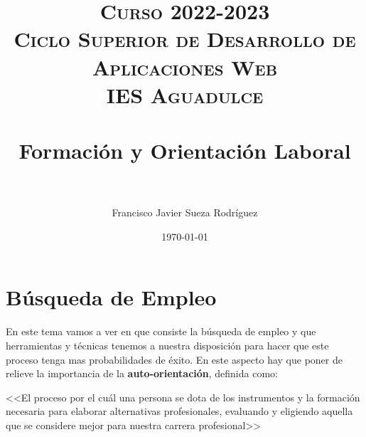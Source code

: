 


\title{
\normalfont \normalsize
\textsc{{\bfseries Curso 2022-2023} \\ Ciclo Superior de Desarrollo de Aplicaciones Web \\ IES Aguadulce} \\ [25pt]
\horrule{0.5pt} \\[0.4cm]
\huge Formación y Orientación Laboral \\
\horrule{0.5pt} \\[0.4cm]
}

\author{Francisco Javier Sueza Rodríguez}
\date{\normalsize\today}


\makeglossaries
{}



\maketitle

\newpage

\tableofcontents



\newpage

\chapter{Búsqueda de Empleo}
En este tema vamos a ver en que consiste la búsqueda de empleo y que herramientas y técnicas tenemos a nuestra disposición para hacer que este proceso tenga mas probabilidades de éxito. En este aspecto hay que poner de relieve la importancia de la \textbf{auto-orientación}, definida como:

<<El proceso por el cuál una persona se dota de los instrumentos y la formación necesaria para elaborar alternativas profesionales, evaluando y eligiendo aquella que se considere mejor para nuestra carrera profesional>>\cite{apuntes01}

